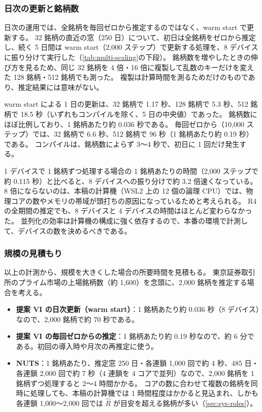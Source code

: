 \subsubsection{日次の更新と銘柄数}

日次の運用では、全銘柄を毎回ゼロから推定するのではなく、warm start で更新する。
32 銘柄の直近の窓（250 日）について、初日は全銘柄をゼロから推定し、続く 5 日間は warm start（2,000 ステップ）で更新する処理を、8 デバイスに振り分けて実行した（\cref{tab:multi-scaling}の下段）。
銘柄数を増やしたときの伸び方を見るため、同じ 32 銘柄を 4 倍・16 倍に複製して乱数のキーだけを変えた 128 銘柄・512 銘柄でも測った。
複製は計算時間を測るためだけのものであり、推定結果には意味がない。

warm start による 1 日の更新は、32 銘柄で 1.17 秒、128 銘柄で 5.3 秒、512 銘柄で 18.5 秒（いずれもコンパイルを除く、5 日の中央値）であった。
銘柄数にほぼ比例しており、1 銘柄あたり約 0.036 秒である。
毎回ゼロから（10,000 ステップ）では、32 銘柄で 6.6 秒、512 銘柄で 96 秒（1 銘柄あたり約 0.19 秒）である。
コンパイルは、銘柄数によらず 3〜4 秒で、初日に 1 回だけ発生する。

1 デバイスで 1 銘柄ずつ処理する場合の 1 銘柄あたりの時間（2,000 ステップで約 0.115 秒）と比べると、8 デバイスへの振り分けで約 3.2 倍速くなっている。
8 倍にならないのは、本稿の計算機（WSL2 上の 12 個の論理 CPU）では、物理コアの数やメモリの帯域が頭打ちの原因になっているためと考えられる。
R4 の全期間の推定でも、8 デバイスと 4 デバイスの時間はほとんど変わらなかった。
並列化の効率は計算機の構成に強く依存するので、本番の環境で計測して、デバイスの数を決めるべきである。

\subsubsection{規模の見積もり}

以上の計測から、規模を大きくした場合の所要時間を見積もる。
東京証券取引所のプライム市場の上場銘柄数（約 1,600）を念頭に、2,000 銘柄を推定する場合を考える。

\begin{itemize}
  \item \textbf{提案 VI の日次更新（warm start）}：1 銘柄あたり約 0.036 秒（8 デバイス）なので、2,000 銘柄で約 70 秒である。
  \item \textbf{提案 VI の毎回ゼロからの推定}：1 銘柄あたり約 0.19 秒なので、約 6 分である。初回の導入時や月次の再推定に使う。
  \item \textbf{NUTS}：1 銘柄あたり、推定窓 250 日・各連鎖 1,000 回で約 4 秒、485 日・各連鎖 2,000 回で約 7 秒（4 連鎖を 4 コアで並列）なので、2,000 銘柄を 1 銘柄ずつ処理すると 2〜4 時間かかる。
    コアの数に合わせて複数の銘柄を同時に処理しても、本稿の計算機では 1 時間程度はかかると見込まれ、しかも各連鎖 1,000〜2,000 回では $\hat R$ が目安を超える銘柄が多い（\cref{sec:sys-roles}）。
\end{itemize}

